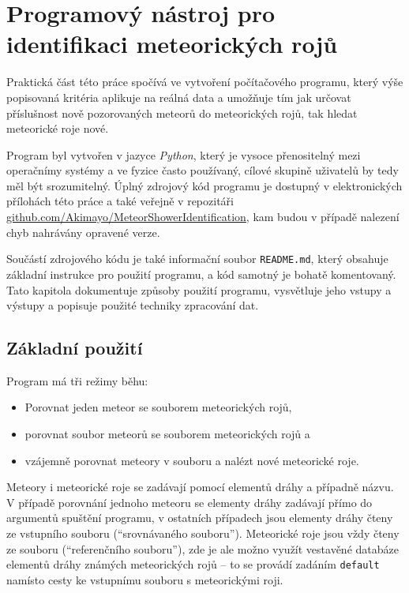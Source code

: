 \chapter{Programový nástroj pro identifikaci meteorických rojů\label{cpt:practical}}%
Praktická část této práce spočívá ve vytvoření počítačového programu, který výše popisovaná kritéria aplikuje na reálná data a umožňuje tím jak určovat příslušnost nově pozorovaných meteorů do meteorických rojů, tak hledat meteorické roje nové.

Program byl vytvořen v jazyce \textit{Python}, který je vysoce přenositelný mezi operačnímy systémy a ve fyzice často používaný, cílové skupině uživatelů by tedy měl být srozumitelný. Úplný zdrojový kód programu je dostupný v elektronických přílohách této práce a také veřejně v repozitáři \\\href{https://github.com/Akimayo/MeteorShowerIdentification}{github.com/Akimayo/MeteorShowerIdentification}, kam budou v případě nalezení chyb nahrávány opravené verze.

Součástí zdrojového kódu je také informační soubor \texttt{README.md}, který obsahuje základní instrukce pro použití programu, a kód samotný je bohatě komentovaný. Tato kapitola dokumentuje způsoby použití programu, vysvětluje jeho vstupy a výstupy a popisuje použité techniky zpracování dat.

\section{Základní použití}%
Program má tři režimy běhu:
\begin{itemize}
    \item Porovnat jeden meteor se souborem meteorických rojů,
    \item porovnat soubor meteorů se souborem meteorických rojů a
    \item vzájemně porovnat meteory v souboru a nalézt nové meteorické roje.
\end{itemize}

Meteory i meteorické roje se zadávají pomocí elementů dráhy a případně názvu. V případě porovnání jednoho meteoru se elementy dráhy zadávají přímo do argumentů spuštění programu, v ostatních případech jsou elementy dráhy čteny ze vstupního souboru ("`srovnávaného souboru"'). Meteorické roje jsou vždy čteny ze souboru ("`referenčního souboru"'), zde je ale možno využít vestavěné databáze elementů dráhy známých meteorických rojů -- to se provádí zadáním \texttt{default} namísto cesty ke vstupnímu souboru s meteorickými roji.

